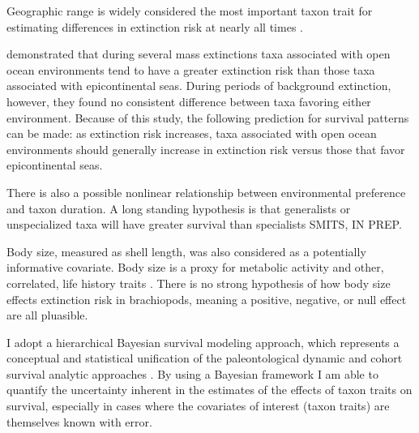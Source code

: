 \documentclass[12pt,letterpaper]{article}
\begin{document}
Geographic range is widely considered the most important taxon trait for estimating differences in extinction risk at nearly all times \citep{Jablonski1986,Jablonski1987,Jablonski2003,Payne2007}.

\citet{Miller2009a} demonstrated that during several mass extinctions taxa associated with open ocean environments tend to have a greater extinction risk than those taxa associated with epicontinental seas. During periods of background extinction, however, they found no consistent difference between taxa favoring either environment. Because of this study, the following prediction for survival patterns can be made: as extinction risk increases, taxa associated with open ocean environments should generally increase in extinction risk versus those that favor epicontinental seas.

There is also a possible nonlinear relationship between environmental preference and taxon duration. A long standing hypothesis is that generalists or unspecialized taxa will have greater survival than specialists \citep{Simpson1944,Liow2004a,Liow2007b,Nurnberg2013a,Nurnberg2015,Baumiller1993} \uppercase{Smits, in prep}. 

Body size, measured as shell length, was also considered as a potentially informative covariate. Body size is a proxy for metabolic activity and other, correlated, life history traits \citep{Payne2014}. There is no strong hypothesis of how body size effects extinction risk in brachiopods, meaning a positive, negative, or null effect are all pluasible.

I adopt a hierarchical Bayesian survival modeling approach, which represents a conceptual and statistical unification of the paleontological dynamic and cohort survival analytic approaches \citep{VanValen1973,VanValen1979,Raup1978,Raup1975,Foote1988,Baumiller1993,Simpson2006}. By using a Bayesian framework I am able to quantify the uncertainty inherent in the estimates of the effects of taxon traits on survival, especially in cases where the covariates of interest (taxon traits) are themselves known with error. 
\end{document}
